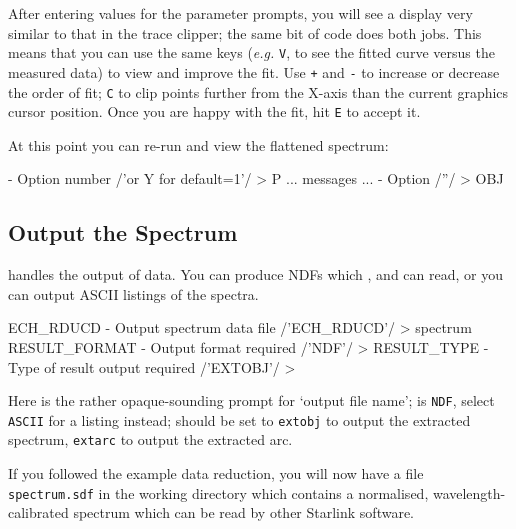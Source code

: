 \documentclass[twoside,11pt]{starlink}
\providecommand{\scspec}[2]{#1}
\begin{document}
After entering values for the parameter prompts, you will see a display
very similar to that in the trace clipper; the same bit of code does both
jobs.  This means that you can use the same keys ({\it{e.g.}} \verb+V+, to
see the fitted curve versus the measured data) to view and improve the fit.
Use \verb=+= and \verb=-= to increase or decrease the order of fit; \verb+C+
to clip points further from the X-axis than the current graphics cursor
position.  Once you are happy with the fit, hit \verb+E+ to accept it.

At this point you can re-run
and view the flattened spectrum:

{
\scspec{\small}{ }
\begin{terminalv}
    - Option number /'or Y for default=1'/ > P
    ... messages ...
    - Option /''/ > OBJ
\end{terminalv}
}


\subsection{Output the Spectrum}

handles the output of data.
You can produce NDFs which \cite{dipso},
 and  can read,
or you can output ASCII listings of the spectra.

{
\scspec{\small}{ }
\begin{terminalv}
   ECH_RDUCD - Output spectrum data file /'ECH_RDUCD'/ > spectrum
   RESULT_FORMAT - Output format required /'NDF'/ >
   RESULT_TYPE - Type of result output required /'EXTOBJ'/ >
\end{terminalv}
}

Here
 is the rather opaque-sounding
prompt for `output file name';
 is \verb+NDF+,
select \verb+ASCII+ for a listing instead;
 should be set to
\verb+extobj+ to output the extracted spectrum, \verb+extarc+ to output
the extracted arc.

If you followed the example data reduction, you will now have a file
\verb+spectrum.sdf+ in the working directory which contains a normalised,
wavelength-calibrated spectrum which can be read by other Starlink
software.
\end{document}
